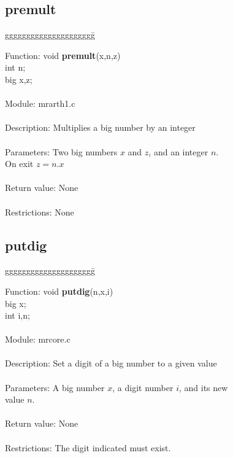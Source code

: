 \subsection{premult}

\begin{tabbing}
ggggggggggggggggggggg\= \kill

      Function:      \>void {\bf premult}(x,n,z) \\
                     \>int n; \\
                     \>big x,z; \\
      \ \\
      Module:        \>mrarth1.c \\
      \ \\
      Description:   \>Multiplies a big number by an integer \\
      \ \\
      Parameters:    \>Two big numbers $x$ and $z$, and an integer $n$. \\
                     \>On exit $z=n.x$ \\
      \ \\
      Return value:  \>None \\
      \ \\
      Restrictions:  \>None \\


\end{tabbing}

\subsection{putdig}

\begin{tabbing}
ggggggggggggggggggggg\= \kill

      Function:      \>void {\bf putdig}(n,x,i) \\
                     \>big x; \\
                     \>int i,n; \\
      \ \\
      Module:        \>mrcore.c \\
      \ \\
      Description:   \>Set a digit of a big number to a given value  \\
      \ \\
      Parameters:    \>A big number $x$, a digit number $i$, and its new \\
                     \>value $n$. \\
      \ \\
      Return value:  \>None \\
      \ \\
      Restrictions:  \>The digit indicated must exist. \\
      
\end{tabbing}

